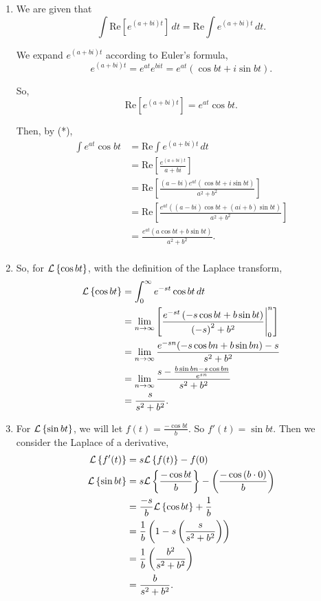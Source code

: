 \documentclass[../hw7]{subfiles}
\begin{document}
\begin{enumerate}[label= (\alph*)]
    \item We are given that
    \begin{equation*}
        \int\text{Re}\left[ e^{(a+bi)t}\right]\,dt = \text{Re}\int e^{(a+bi)t}\,dt. \tag{*}
    \end{equation*}
    
    We expand $e^{(a+bi)t}$ according to Euler's formula,
    \[e^{(a+bi)t} = e^{at}e^{bit} = e^{at}\left( \cos{bt}+i\sin{bt} \right).\]
    
    So, \[\text{Re}\left[ e^{(a+bi)t} \right]=e^{at}\cos{bt}.\]
    
    Then, by (*),
    \begin{align*}
        \int e^{at}\cos{bt} &= \text{Re}\int e^{(a+bi)t}\,dt \\
        &= \text{Re}\left[ \frac{e^{(a+bi)t}}{a+bi} \right] \\
        &= \text{Re}\left[ \frac{(a-bi)e^{at}(\cos{bt}+i\sin{bt})}{a^2+b^2} \right] \\
        &= \text{Re}\left[ \frac{e^{at}\left( (a-bi)\cos{bt}+(ai+b)\sin{bt} \right)}{a^2+b^2} \right] \\
        &= \frac{e^{at}(a\cos{bt}+b\sin{bt})}{a^2+b^2} \tag{**}. \\
    \end{align*}

    \item So, for $\mathcal{L}\left\{\cos{bt}\right\}$, with the definition of the Laplace transform,
    \begin{align*}
        \mathcal{L}\left\{\cos{bt}\right\}&=\int_{0}^{\infty}e^{-st}\cos{bt}\,dt \\
        &=\lim\limits_{n\to\infty}\left[ \frac{e^{-st}\left( -s\cos{bt}+b\sin{bt} \right)}{{(-s)}^2+b^2}\Bigg\vert_{0}^{n} \right] \\
        &=\lim\limits_{n\to\infty} \frac{e^{-sn}(-s\cos{bn}+b\sin{bn})-s}{s^2+b^2} \\
        &=\lim\limits_{n\to\infty}\frac{s-\frac{b\sin{bn}-s\cos{bn}}{e^{sn}}}{s^2+b^2} \\
        &= \frac{s}{s^2+b^2}. \\
    \end{align*}

    \item For $\mathcal{L}\left\{\sin{bt}\right\}$, we will let $f(t)=\frac{-\cos{bt}}{b}$. So $f'(t)=\sin{bt}$.
    Then we consider the Laplace of a derivative,
    \begin{align*}
        \mathcal{L}\left\{f'(t)\right\}&=s\mathcal{L}\left\{f(t)\right\}-f(0) \\
        \mathcal{L}\left\{\sin{bt}\right\}&=s\mathcal{L}\left\{\frac{-\cos{bt}}{b}\right\}-\left( \frac{-\cos{(b\cdot 0)}}{b} \right) \\
        &= \frac{-s}{b}\mathcal{L}\left\{\cos{bt}\right\}+\frac{1}{b} \\
        &= \frac{1}{b}\left( 1-s\left( \frac{s}{s^2+b^2} \right) \right) \\
        &= \frac{1}{b}\left( \frac{b^2}{s^2+b^2} \right) \\
        &= \frac{b}{s^2+b^2}. \\
    \end{align*}


\end{enumerate}
\end{document}
